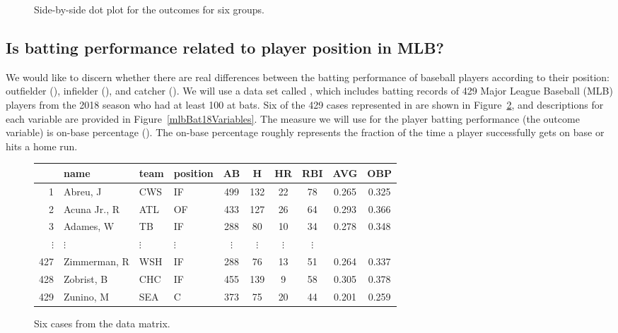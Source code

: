 \begin{figure}[h]
  \centering
  \caption{Side-by-side dot plot for the outcomes for six groups.}
  \label{toyANOVA}
\end{figure}


\subsection{Is batting performance related to player position in MLB?}


\newcommand{\mlbdata}{\data{bat18}}
\newcommand{\mlbN}{429}
\newcommand{\mlbK}{3}
\newcommand{\mlbMinAB}{100}
\newcommand{\mlbDFA}{2}
\newcommand{\mlbDFB}{426}
\newcommand{\mlbF}{5.077}
\newcommand{\mlbPvalue}{0.0066}

We would like to discern whether there are real differences
between the batting performance of baseball players according
to their position:
outfielder (), infielder (),
and catcher ().
We will use a data set called \mlbdata{},
which includes batting records of \mlbN{} Major League
Baseball (MLB) players from the 2018 season who had
at least \mlbMinAB{} at bats.
Six of the \mlbN{} cases represented in \mlbdata{}
are shown in Figure~\ref{mlbBat18DataMatrix},
and descriptions for each variable are provided
in Figure~\ref{mlbBat18Variables}.
The measure we will use for the player batting
performance (the outcome variable) is on-base
percentage ().
The on-base percentage roughly represents the fraction
of the time a player successfully gets on base or hits
a home run.

\begin{figure}[h]
\centering
\begin{tabular}{r lll ccc ccc}
  \hline
  & name & team & position & AB & H & HR &RBI & AVG & OBP \\ 
  \hline
  1 &  Abreu, J & CWS & IF &  499 &  132 &   22 &
      78 & 0.265 & 0.325 \\
  2 &  Acuna Jr., R & ATL & OF &  433 &  127 &   26 &
      64 & 0.293 & 0.366 \\
  3 &  Adames, W & TB & IF &  288 &   80 &   10 &
      34 & 0.278 & 0.348 \\
  $\vdots$ & $\vdots$ & $\vdots$ & $\vdots$ & $\vdots$ &
      $\vdots$ & $\vdots$ & $\vdots$ \\
  427 &  Zimmerman, R & WSH & IF & 288 &   76 &
      13 &   51 & 0.264 & 0.337 \\
  428 & Zobrist, B & CHC & IF & 455 & 139 & 9 &
      58 & 0.305 & 0.378 \\
  \mlbN{} &  Zunino, M & SEA & C &  373 &   75 &   20 &
      44 & 0.201 & 0.259 \\
   \hline
\end{tabular}
\caption{Six cases from the \mlbdata{} data matrix.}
\label{mlbBat18DataMatrix}
\end{figure}

